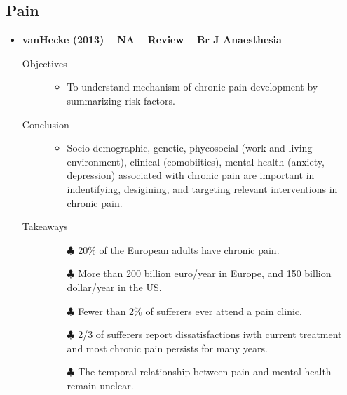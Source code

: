 \documentclass{article}
\begin{document}
\subsection{Pain}
\begin{itemize}	
	\item{\bf vanHecke (2013) -- NA -- Review -- Br J Anaesthesia} 
		\begin{description}
			\item[Objectives]\mbox{}\par
				\begin{itemize}
					\item To understand mechanism of chronic pain development by summarizing risk factors.
				\end{itemize}
			\item[Conclusion] \mbox{}\par
				\begin{itemize}
					\item Socio-demographic, genetic, phycosocial (work and living environment), clinical (comobiities), mental health (anxiety, depression) associated with chronic pain are important in indentifying, desigining, and targeting relevant interventions in chronic pain.
				\end{itemize}
			\item[Takeaways] \mbox{}\par
				\begin{itemize}
					\item[$\clubsuit$] 20\% of the European adults have chronic pain.
					\item[$\clubsuit$] More than 200 billion euro/year in Europe, and 150 billion dollar/year in the US.
					\item[$\clubsuit$] Fewer than 2\% of sufferers ever attend a pain clinic. 
					\item[$\clubsuit$] 2/3 of sufferers report dissatisfactions iwth current treatment and most chronic pain persists for many years.
					\item[$\clubsuit$] The temporal relationship between pain and mental health remain unclear.
				\end{itemize}
		\end{description}

\end{itemize}
\end{document}
